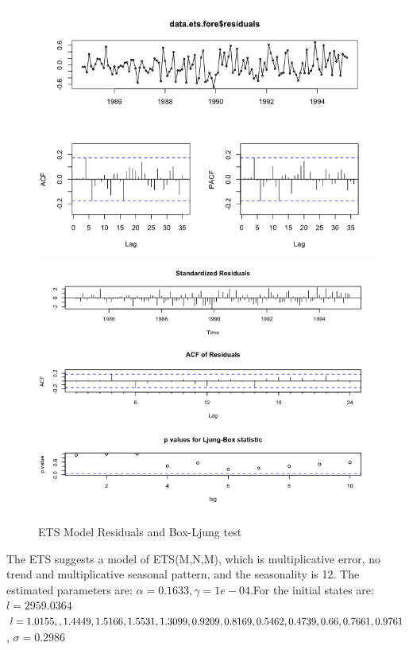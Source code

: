 \documentclass[journal, a4paper]{IEEEtran}
\begin{document}
\begin{figure}[H]
\begin{center}
\includegraphics[scale=0.3]{fig1/est_diagnostics.png}
\includegraphics[scale=0.3]{fig1/ets_tsdiag.png}
\caption{ETS Model Residuals and Box-Ljung test}
\label{fig1:ets_diagnostics}
\end{center}
\end{figure}

The ETS suggests a model of ETS(M,N,M), which is multiplicative error, no trend and multiplicative seasonal pattern, and the seasonality is 12. The estimated parameters are:
$\alpha=0.1633,\gamma=1e-04$.For the initial states are:
$l=2959.0364$
$l=1.0155, , 1.4449, 1.5166, 1.5531, 1.3099, 0.9209,
           0.8169, \\0.5462, 0.4739, 0.66, 0.7661, 0.9761$,
$\sigma=0.2986$
\end{document}

